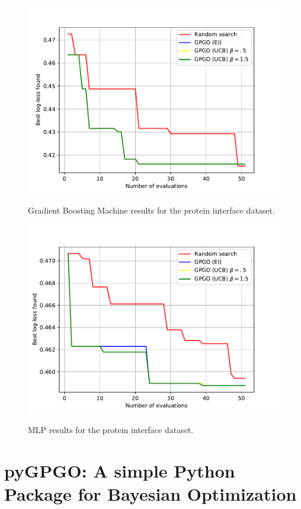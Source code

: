 \documentclass[10pt,a4paper,twoside]{book}
\begin{document}
\begin{figure}
\centering
\caption{Gradient Boosting Machine results for the protein interface dataset.}
\includegraphics[scale=0.75]{figures/chapter4/pinter/gbm}
\label{fig:affgbm}
\end{figure}

\begin{figure}
\centering
\caption{MLP results for the protein interface dataset.}
\includegraphics[scale=0.75]{figures/chapter4/pinter/mlp}
\label{fig:affmlp}
\end{figure}

\chapter{pyGPGO: A simple Python Package for Bayesian Optimization}
\end{document}
